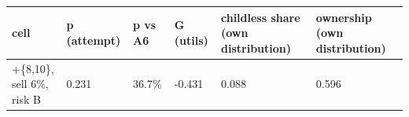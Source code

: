 \begingroup\small
\setlength{\tabcolsep}{3pt}
\renewcommand{\arraystretch}{1.04}
\begin{tabularx}{\linewidth}{XXXXXX}
\toprule
cell & p (attempt) & p vs A6 & G (utils) & childless share (own distribution) & ownership (own distribution) \\
\midrule
[0,6]+\{8,10\}, sell 6\%, risk B & 0.231 & 36.7\% & -0.431 & 0.088 & 0.596 \\
\bottomrule
\end{tabularx}
\endgroup
